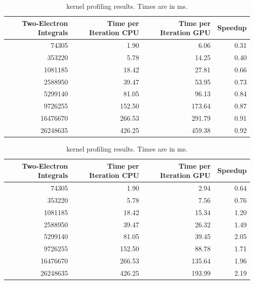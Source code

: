 \begin{table}[h!]
\begin{center}
\caption[ kernel profiling results.]{ kernel profiling results. Times are in ms.}
\label{tab:PQprofalg1}
\begin{tabular}{rrrr}
\toprule
	Two-Electron Integrals	&	Time per Iteration CPU	&	Time per Iteration GPU	&	Speedup	\\
\midrule
	74305	&	1.90		&	6.06		&	0.31		\\
	353220	&	5.78		&	14.25	&	0.40		\\
	1081185	&	18.42	&	27.81	&	0.66		\\
	2588950	&	39.47	&	53.95	&	0.73		\\
	5299140	&	81.05	&	96.13	&	0.84		\\
	9726255	&	152.50	&	173.64	&	0.87		\\
	16476670	&	266.53	&	291.79	&	0.91		\\
	26248635	&	426.25	&	459.38	&	0.92		\\
\bottomrule
\end{tabular}
\end{center}
\end{table}

\begin{table}[h!]
\begin{center}
\caption[ kernel profiling results.]{ kernel profiling results. Times are in ms.}
\label{tab:PQprofalg2}
\begin{tabular}{rrrr}
\toprule
	Two-Electron Integrals	&	Time per Iteration CPU		&	Time per Iteration GPU	&	Speedup	\\
\midrule
	74305	&	1.90		&	2.94		&	0.64	\\
	353220	&	5.78		&	7.56		&	0.76	\\
	1081185	&	18.42	&	15.34	&	1.20	\\
	2588950	&	39.47	&	26.32	&	1.49	\\
	5299140	&	81.05	&	39.45	&	2.05	\\
	9726255	&	152.50	&	88.78	&	1.71	\\
	16476670	&	266.53	&	135.64	&	1.96	\\
	26248635	&	426.25	&	193.99	&	2.19	\\
\bottomrule
\end{tabular}
\end{center}
\end{table}

